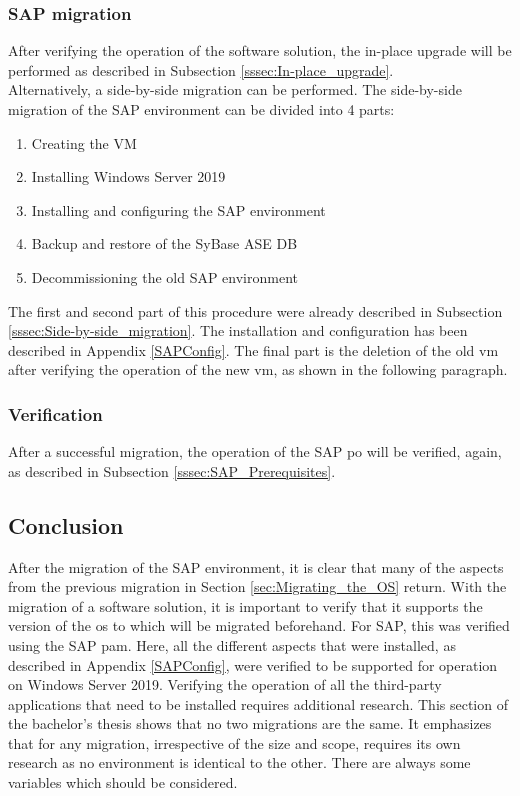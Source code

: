 \subsubsection{SAP migration}
After verifying the operation of the software solution, the in-place upgrade will be performed as described in Subsection \ref{sssec:In-place_upgrade}.\\
Alternatively, a side-by-side migration can be performed. 
The side-by-side migration of the SAP environment can be divided into 4 parts:
\begin{enumerate}
    \item Creating the VM
    \item Installing Windows Server 2019
    \item Installing and configuring the SAP environment
    \item Backup and restore of the SyBase ASE DB
    \item Decommissioning the old SAP environment
\end{enumerate}
The first and second part of this procedure were already described in Subsection \ref{sssec:Side-by-side_migration}.
The installation and configuration has been described in Appendix \ref{SAPConfig}. 
The final part is the deletion of the old \acrshort{vm} after verifying the operation of the new \acrshort{vm}, as shown in the following paragraph.

\subsubsection{Verification}
After a successful migration, the operation of the SAP \acrshort{po} will be verified, again, as described in Subsection \ref{sssec:SAP_Prerequisites}.

\subsection{Conclusion}
After the migration of the SAP environment, it is clear that many of the aspects from the previous migration in Section \ref{sec:Migrating_the_OS} return. 
With the migration of a software solution, it is important to verify that it supports the version of the \acrshort{os} to which will be migrated beforehand. 
For SAP, this was verified using the SAP \acrshort{pam}.
Here, all the different aspects that were installed, as described in Appendix \ref{SAPConfig}, were verified to be supported for operation on Windows Server 2019. 
Verifying the operation of all the third-party applications that need to be installed requires additional research. 
This section of the bachelor's thesis shows that no two migrations are the same. 
It emphasizes that for any migration, irrespective of the size and scope, requires its own research as no environment is identical to the other. 
There are always some variables which should be considered.  
\clearpage

